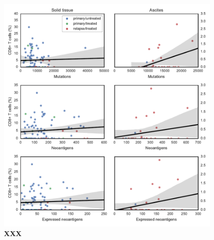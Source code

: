 \documentclass{article}
\begin{document}
\begin{figure}[htbp]
\centering
\includegraphics[scale=1.0]{../figures/cd8_vs_muts.pdf}
\caption{\textbf{XXX}}
\label{fig:cd8vsmuts}
\end{figure}


\newpage
\FloatBarrier

 

\end{document}
